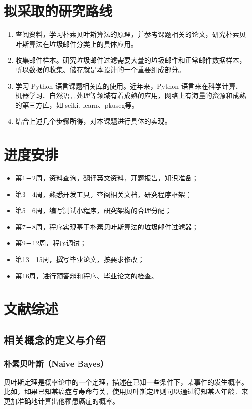 \documentclass[UTF8]{ctexart}
\begin{document}
\section{拟采取的研究路线}
\begin{enumerate}
\item 查阅资料，学习朴素贝叶斯算法的原理，并参考课题相关的论文，研究朴素贝叶斯算法在垃圾邮件分类上的具体应用。
\item 收集邮件样本。研究垃圾邮件过滤需要大量的垃圾邮件和正常邮件数据样本，所以数据的收集、储存就是本设计的一个重要组成部分。
\item 学习 Python 语言课题相关库的使用。近年来，Python 语言来在科学计算、机器学习、自然语言处理等领域有着成熟的应用，网络上有海量的资源和成熟的第三方库，如 scikit-learn、pkuseg\cite{pkuseg}等。
\item 结合上述几个步骤所得，对本课题进行具体的实现。
\end{enumerate}


\section{进度安排}
\begin{itemize}
\item 第1－2周，资料查询，翻译英文资料，开题报告，知识准备；
\item 第3－4周，熟悉开发工具，查阅相关文档，研究程序框架；
\item 第5－6周，编写测试小程序，研究架构的合理分配；
\item 第7－8周，程序实现基于朴素贝叶斯算法的垃圾邮件过滤器；
\item 第9－12周，程序调试；
\item 第13－15周，撰写毕业论文，按要求修改；
\item 第16周，进行预答辩和程序、毕业论文的检查。
\end{itemize}

\section{文献综述}
\subsection{相关概念的定义与介绍}
\subsubsection{朴素贝叶斯（Naive Bayes）}
贝叶斯定理是概率论中的一个定理，描述在已知一些条件下，某事件的发生概率。比如，如果已知某癌症与寿命有关，使用贝叶斯定理则可以通过得知某人年龄，来更加准确地计算出他罹患癌症的概率。
\end{document}
